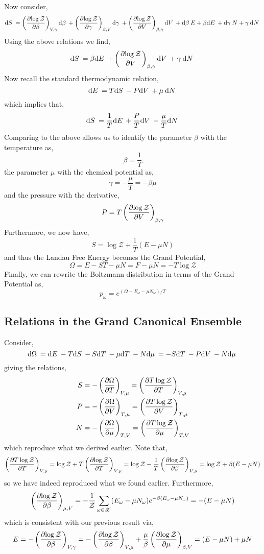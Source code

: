 \documentclass[12pt]{article}
\begin{document}
Now consider,
\[ \mathrm{d}S \: = \left( \frac{\partial{\log{\mathcal{Z}}}}{\partial{\beta}} \right)_{V, \gamma} \mathrm{d}\beta \: + \left( \frac{\partial{\log{\mathcal{Z}}}}{\partial{\gamma}} \right)_{\beta, V} \mathrm{d}\gamma \: + \left( \frac{\partial{\log{\mathcal{Z}}}}{\partial{V}} \right)_{\beta, \gamma} \mathrm{d}V \: + \mathrm{d}\beta \: E + \beta \mathrm{d}E \: + \mathrm{d}\gamma \: N + \gamma \: \mathrm{d}N \: \]
Using the above relations we find,
\[ \mathrm{d}S \: =  \beta \mathrm{d}E \: +  \left( \frac{\partial{\log{\mathcal{Z}}}}{\partial{V}} \right)_{\beta, \gamma} \mathrm{d}V \: + \gamma \: \mathrm{d}N \: \]
Now recall the standard thermodynamic relation,
\[ \mathrm{d}E \: = T \mathrm{d}S \: - P \mathrm{d}V \: + \mu \: \mathrm{d}N \: \]
which implies that,
\[ \mathrm{d}S \: = \frac{1}{T} \mathrm{d}E \: + \frac{P}{T} \mathrm{d}V \: - \frac{\mu}{T} \mathrm{d}N \: \]
Comparing to the above allows us to identify the parameter $\beta$ with the temperature as,
\[ \beta = \frac{1}{T} \]
the parameter $\mu$ with the chemical potential as,
\[ \gamma = - \frac{\mu}{T} = - \beta \mu \]
and the pressure with the derivative,
\[ P = T  \left( \frac{\partial{\log{\mathcal{Z}}}}{\partial{V}} \right)_{\beta, \gamma} \]
Furthermore, we now have,
\[ S = \log{\mathcal{Z}} + \frac{1}{T} (E - \mu N) \]
and thus the Landau Free Energy becomes the Grand Potential,
\[ \Omega = E - ST - \mu N = F - \mu N = - T \log{\mathcal{Z}} \]
Finally, we can rewrite the Boltzmann distribution in terms of the Grand Potential as,
\[ p_\omega = e^{(\Omega - E_\omega - \mu N_\omega)/T} \]

\subsection{Relations in the Grand Canonical Ensemble}

Consider,
\[ \mathrm{d}\Omega \: = \mathrm{d}E \: - T \mathrm{d}S \: - S \mathrm{d}T \: - \mu \mathrm{d}T \: - N \mathrm{d}\mu \: = - S \mathrm{d}T \: - P \mathrm{d}V \: - N \mathrm{d}\mu \: \]
giving the relations,
\begin{align*}
S & = - \left( \frac{\partial{\Omega}}{\partial{T}} \right)_{V, \mu} = \left( \frac{\partial{T \log{\mathcal{Z}}}}{\partial{T}} \right)_{V, \mu} 
\\
P & = - \left( \frac{\partial{\Omega}}{\partial{V}} \right)_{T, \mu} = \left( \frac{\partial{T \log{\mathcal{Z}}}}{\partial{V}} \right)_{T, \mu} 
\\
N & = - \left( \frac{\partial{\Omega}}{\partial{\mu}} \right)_{T, V} = \left( \frac{\partial{T \log{\mathcal{Z}}}}{\partial{\mu}} \right)_{T, V} 
\end{align*}
which reproduce what we derived earlier. Note that,
\begin{align*}
\left( \frac{\partial{T \log{\mathcal{Z}}}}{\partial{T}} \right)_{V, \mu} = \log{\mathcal{Z}} + T \left( \frac{\partial{\log{\mathcal{Z}}}}{\partial{T}} \right)_{V, \mu} = \log{\mathcal{Z}} - \frac{1}{T} \left( \frac{\partial{\log{\mathcal{Z}}}}{\partial{\beta}} \right)_{V, \mu} = \log{\mathcal{Z}} + \beta( E - \mu N) 
\end{align*}
so we have indeed reproduced what we found earlier.
Furthermore,
\begin{align*}
\left( \frac{\partial{\log{\mathcal{Z}}}}{\partial{\beta}} \right)_{\mu, V} = - \frac{1}{\mathcal{Z}} \sum_{\omega \in \mathscr{X}} (E_\omega - \mu N_\omega) e^{-\beta (E_\omega - \mu N_\omega)} = - (E  - \mu N)
\end{align*}
which is consistent with our previous result via,
\[ E = - \left( \frac{\partial{\log{\mathcal{Z}}}}{\partial{\beta}} \right)_{V, \gamma} =  - \left( \frac{\partial{\log{\mathcal{Z}}}}{\partial{\beta}} \right)_{V, \mu} + \frac{\mu}{\beta} \left( \frac{\partial{\log{\mathcal{Z}}}}{\partial{\mu}} \right)_{\beta, V} = (E - \mu N) + \mu N  \]
\end{document}
